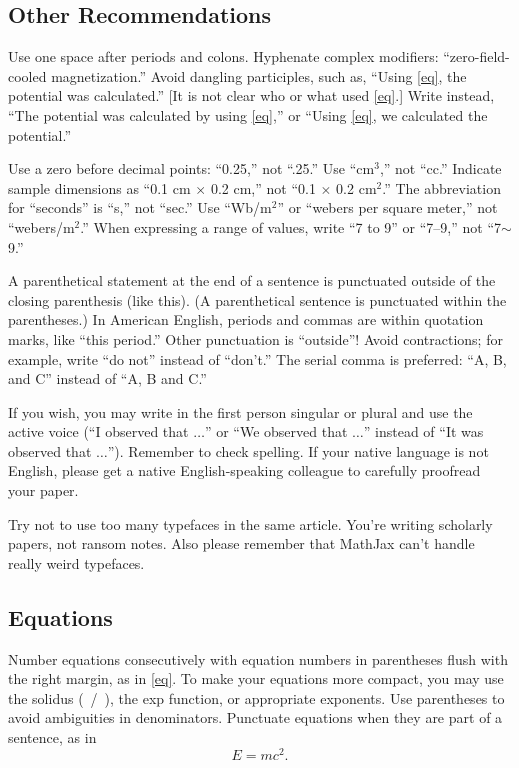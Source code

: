 \documentclass{ieeeaccess}
\begin{document}
\subsection{Other Recommendations}
Use one space after periods and colons. Hyphenate complex modifiers:
``zero-field-cooled magnetization.'' Avoid dangling participles, such as,
``Using \eqref{eq}, the potential was calculated.'' [It is not clear who or what
used \eqref{eq}.] Write instead, ``The potential was calculated by using \eqref{eq},'' or
``Using \eqref{eq}, we calculated the potential.''

Use a zero before decimal points: ``0.25,'' not ``.25.'' Use
``cm$^{3}$,'' not ``cc.'' Indicate sample dimensions as ``0.1 cm
$\times $ 0.2 cm,'' not ``0.1 $\times $ 0.2 cm$^{2}$.'' The
abbreviation for ``seconds'' is ``s,'' not ``sec.'' Use
``Wb/m$^{2}$'' or ``webers per square meter,'' not
``webers/m$^{2}$.'' When expressing a range of values, write ``7 to
9'' or ``7--9,'' not ``7$\sim $9.''

A parenthetical statement at the end of a sentence is punctuated outside of
the closing parenthesis (like this). (A parenthetical sentence is punctuated
within the parentheses.) In American English, periods and commas are within
quotation marks, like ``this period.'' Other punctuation is ``outside''!
Avoid contractions; for example, write ``do not'' instead of ``don't.'' The
serial comma is preferred: ``A, B, and C'' instead of ``A, B and C.''

If you wish, you may write in the first person singular or plural and use
the active voice (``I observed that $\ldots$'' or ``We observed that $\ldots$''
instead of ``It was observed that $\ldots$''). Remember to check spelling. If
your native language is not English, please get a native English-speaking
colleague to carefully proofread your paper.

Try not to use too many typefaces in the same article. You're writing
scholarly papers, not ransom notes. Also please remember that MathJax
can't handle really weird typefaces.

\subsection{Equations}
Number equations consecutively with equation numbers in parentheses flush
with the right margin, as in \eqref{eq}. To make your equations more
compact, you may use the solidus (~/~), the exp function, or appropriate
exponents. Use parentheses to avoid ambiguities in denominators. Punctuate
equations when they are part of a sentence, as in
\begin{equation}E=mc^2.\label{eq}\end{equation}
\end{document}
